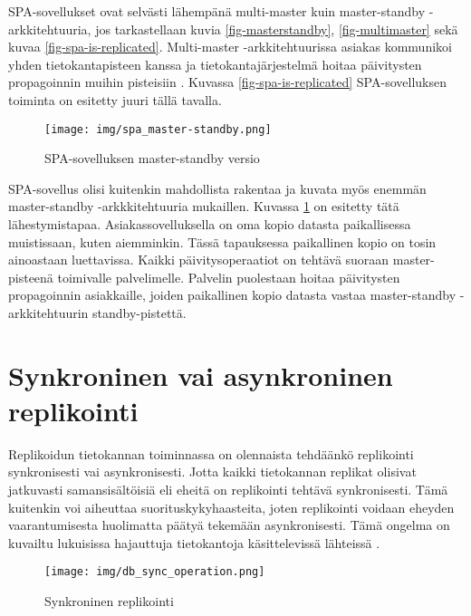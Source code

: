 \documentclass[finnish,twoside,censored,csm,sw-track-2018]{HYthesisML}
\begin{document}
SPA-sovellukset ovat selvästi lähempänä multi-master kuin master-standby -arkkitehtuuria, jos tarkastellaan kuvia \ref{fig-masterstandby}, \ref{fig-multimaster} sekä kuvaa \ref{fig-spa-is-replicated}. Multi-master -arkkitehtuurissa asiakas kommunikoi yhden tietokantapisteen kanssa ja tietokantajärjestelmä hoitaa päivitysten propagoinnin muihin pisteisiin \citep{DSC}. Kuvassa \ref{fig-spa-is-replicated} SPA-sovelluksen toiminta on esitetty juuri tällä tavalla.

\begin{figure}[ht]
  \centering
    \texttt{[image: img/spa\_master-standby.png]}
  \caption{SPA-sovelluksen master-standby versio}
  \label{fig-spa-is-master-standby}
\end{figure}

SPA-sovellus olisi kuitenkin mahdollista rakentaa ja kuvata myös enemmän master-standby -arkkkitehtuuria mukaillen. Kuvassa \ref{fig-spa-is-master-standby} on esitetty tätä lähestymistapaa. Asiakassovelluksella on oma kopio datasta paikallisessa muistissaan, kuten aiemminkin. Tässä tapauksessa paikallinen kopio on tosin ainoastaan luettavissa. Kaikki päivitysoperaatiot on tehtävä suoraan master-pisteenä toimivalle palvelimelle. Palvelin puolestaan hoitaa päivitysten propagoinnin asiakkaille, joiden paikallinen kopio datasta vastaa master-standby -arkkitehtuurin standby-pistettä.

\section{Synkroninen vai asynkroninen replikointi}

Replikoidun tietokannan toiminnassa on olennaista tehdäänkö replikointi synkronisesti vai asynkronisesti. Jotta kaikki tietokannan replikat olisivat jatkuvasti samansisältöisiä eli eheitä on replikointi tehtävä synkronisesti. Tämä kuitenkin voi aiheuttaa suorituskykyhaasteita, joten replikointi voidaan eheyden vaarantumisesta huolimatta päätyä tekemään asynkronisesti. Tämä ongelma on kuvailtu lukuisissa hajauttuja tietokantoja käsittelevissä lähteissä \citep{gray-replication, Tanenbaum, DSAA, DSC, Kleppmann}.

\begin{figure}[ht]
  \centering
    \texttt{[image: img/db\_sync\_operation.png]}
  \caption{Synkroninen replikointi}
  \label{fig-sync-replikointi}
\end{figure}
\end{document}

